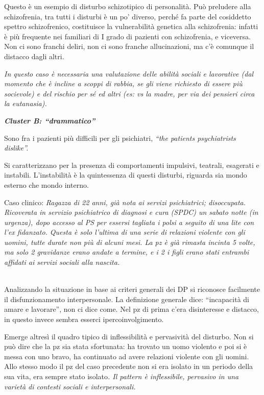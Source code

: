 \documentclass[]{article}
\begin{document}
Questo è un esempio di disturbo schizotipico di personalità. Può
preludere alla schizofrenia, tra tutti i disturbi è un po' diverso,
perché fa parte del cosiddetto spettro schizofrenico, costituisce la
vulnerabilità genetica alla schizofrenia: infatti è più frequente nei
familiari di I grado di pazienti con schizofrenia, e viceversa. Non ci
sono franchi deliri, non ci sono franche allucinazioni, ma c'è comunque
il distacco dagli altri.

\emph{In questo caso è necessaria una valutazione delle abilità sociali
e lavorative (dal momento che è incline a scoppi di rabbia, se gli viene
richiesto di essere più socievole) e del rischio per sé ed altri (es: vs
la madre, per via dei pensieri circa la eutanasia).}

\textbf{\emph{Cluster B: ``drammatico''}}

Sono fra i pazienti più difficili per gli psichiatri, \emph{``the
patients psychiatrists dislike''.}

Si caratterizzano per la presenza di comportamenti impulsivi, teatrali,
esagerati e instabili. L'instabilità è la quintessenza di questi
disturbi, riguarda sia mondo esterno che mondo interno.

Caso clinico: \emph{Ragazza di 22 anni, già nota ai servizi
psichiatrici; disoccupata. Ricoverata in servizio psichiatrico di
diagnosi e cura (SPDC) un sabato notte (in urgenza), dopo accesso al PS
per essersi tagliata i polsi a seguito di una lite con l'ex fidanzato.
Questa è solo l'ultima di una serie di relazioni violente con gli
uomini, tutte durate non più di alcuni mesi. La pz è già rimasta incinta
5 volte, ma solo 2 gravidanze erano andate a termine, e i 2 i figli
erano stati entrambi affidati ai servizi sociali alla nascita.}

\emph{\\
}Analizzando la situazione in base ai criteri generali dei DP si
riconosce facilmente il disfunzionamento interpersonale. La definizione
generale dice: ``incapacità di amare e lavorare'', non ci dice come. Nel
pz di prima c'era disinteresse e distacco, in questo invece sembra
esserci ipercoinvolgimento.

Emerge altresì il quadro tipico di inflessibilità e pervasività del
disturbo. Non si può dire che la pz sia stata sfortunata: ha trovato un
uomo violento e poi si è messa con uno bravo, ha continuato ad avere
relazioni violente con gli uomini. Allo stesso modo il pz del caso
precedente non si era isolato in un periodo della sua vita, era sempre
stato isolato\emph{. Il pattern è inflessibile, pervasivo in una varietà
di contesti sociali e interpersonali.}
\end{document}
